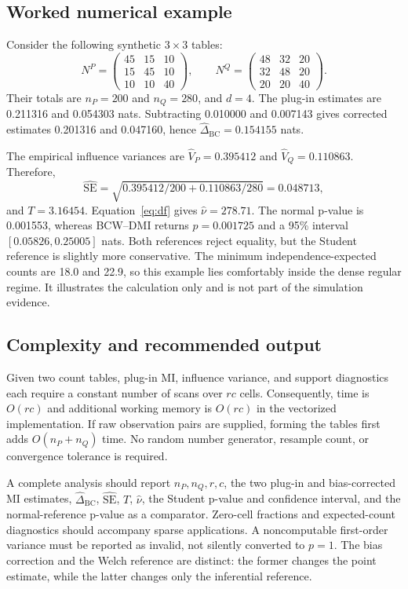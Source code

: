 \documentclass[10pt,twocolumn]{article}
\newcommand{\method}{BCW--DMI}
\begin{document}
\subsection{Worked numerical example}

Consider the following synthetic \(3\times3\) tables:
\begin{equation*}
N^P=
\begin{pmatrix}
45&15&10\\
15&45&10\\
10&10&40
\end{pmatrix},
\qquad
N^Q=
\begin{pmatrix}
48&32&20\\
32&48&20\\
20&20&40
\end{pmatrix}.
\end{equation*}
Their totals are \(n_P=200\) and \(n_Q=280\), and \(d=4\). The plug-in
estimates are 0.211316 and 0.054303 nats. Subtracting 0.010000 and 0.007143
gives corrected estimates 0.201316 and 0.047160, hence
\(\widehat\Delta_{\mathrm{BC}}=0.154155\) nats.

The empirical influence variances are \(\widehat V_P=0.395412\) and
\(\widehat V_Q=0.110863\). Therefore,
\[
  \widehat{\mathrm{SE}}
  =\sqrt{0.395412/200+0.110863/280}
  =0.048713,
\]
and \(T=3.16454\). Equation~\eqref{eq:df} gives
\(\widehat\nu=278.71\). The normal p-value is 0.001553, whereas \method{}
returns \(p=0.001725\) and a 95\% interval
\([0.05826,0.25005]\) nats. Both references reject equality, but the Student
reference is slightly more conservative. The minimum independence-expected
counts are 18.0 and 22.9, so this example lies comfortably inside the dense
regular regime. It illustrates the calculation only and is not part of the
simulation evidence.

\subsection{Complexity and recommended output}

Given two count tables, plug-in MI, influence variance, and support
diagnostics each require a constant number of scans over \(rc\) cells.
Consequently, time is \(O(rc)\) and additional working memory is \(O(rc)\)
in the vectorized implementation. If raw observation pairs are supplied,
forming the tables first adds \(O(n_P+n_Q)\) time. No random number generator,
resample count, or convergence tolerance is required.

A complete analysis should report \(n_P,n_Q,r,c\), the two plug-in and
bias-corrected MI estimates, \(\widehat\Delta_{\mathrm{BC}}\),
\(\widehat{\mathrm{SE}}\), \(T\), \(\widehat\nu\), the Student p-value and
confidence interval, and the normal-reference p-value as a comparator.
Zero-cell fractions and expected-count diagnostics should accompany sparse
applications. A noncomputable first-order variance must be reported as
invalid, not silently converted to \(p=1\). The bias correction and the
Welch reference are distinct: the former changes the point estimate, while
the latter changes only the inferential reference.
\end{document}
